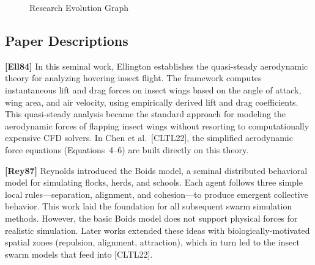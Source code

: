 \documentclass[12pt]{article}
\begin{document}
\begin{figure}[H]
{%
}
\caption{Research Evolution Graph}
\end{figure}

\subsection*{Paper Descriptions}

\bigskip\noindent
\textbf{[Ell84]} In this seminal work, Ellington establishes the quasi-steady
aerodynamic theory for analyzing hovering insect flight. The framework computes
instantaneous lift and drag forces on insect wings based on the angle of attack,
wing area, and air velocity, using empirically derived lift and drag coefficients.
This quasi-steady analysis became the standard approach for modeling the
aerodynamic forces of flapping insect wings without resorting to computationally
expensive CFD solvers. In Chen et al.\ [CLTL22], the simplified aerodynamic force
equations (Equations~4--6) are built directly on this theory.

\bigskip\noindent
\textbf{[Rey87]} Reynolds introduced the Boids model, a seminal distributed
behavioral model for simulating flocks, herds, and schools. Each agent follows
three simple local rules---separation, alignment, and cohesion---to produce
emergent collective behavior. This work laid the foundation for all subsequent
swarm simulation methods. However, the basic Boids model does not support
physical forces for realistic simulation. Later works extended these ideas with
biologically-motivated spatial zones (repulsion, alignment, attraction), which in
turn led to the insect swarm models that feed into [CLTL22].
\end{document}

